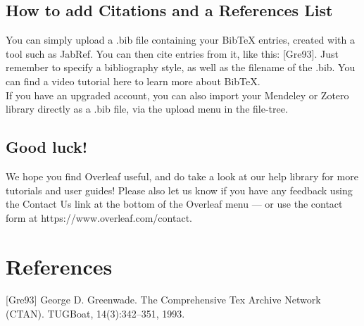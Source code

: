 \documentclass{article}
\begin{document}
	\subsection{How to add Citations and a References List}
	You can simply upload a .bib file containing your BibTeX entries, created with a tool such as JabRef. You can then cite entries from it, like this: [Gre93]. Just remember to specify a bibliography style, as well as the filename of the .bib. You can find a video tutorial here to learn more about BibTeX.\\
	\indent If you have an upgraded account, you can also import your Mendeley or Zotero library directly as a .bib file, via the upload menu in the file-tree.
	
	\subsection{Good luck!}
	We hope you find Overleaf useful, and do take a look at our help library for more tutorials and user guides! Please also let us know if you have any feedback using the Contact Us link at the bottom of the Overleaf menu — or use the contact form at https://www.overleaf.com/contact.\\
	
	\section*{References}
	[Gre93] George D. Greenwade. The Comprehensive Tex Archive Network (CTAN). TUGBoat,
	14(3):342–351, 1993.
	
\end{document}
